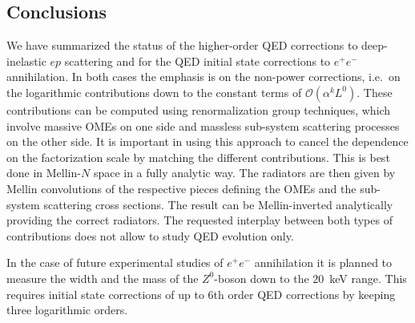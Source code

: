 \subsection{Conclusions}\label{sec:4}

\vspace*{1mm}
\noindent
We have summarized the status of the higher-order QED corrections to deep-inelastic $ep$ scattering and 
for the QED initial state corrections to $e^+e^-$ annihilation. In both cases the emphasis is on the non-power 
corrections, i.e.~on the logarithmic contributions down to the constant terms of $\mathcal{O}(\alpha^k L^0)$. These 
contributions can be computed using renormalization group techniques, which involve massive OMEs on one side 
and massless sub-system scattering processes on the other side. It is important in using this approach to cancel
the dependence on the factorization scale by matching the different contributions. This is best done in 
Mellin-$N$ space in a fully analytic way. The radiators are then given by Mellin convolutions of the respective 
pieces defining the OMEs and the sub-system scattering cross sections. The result can be Mellin-inverted
analytically providing the correct radiators. The requested interplay between both types of contributions does not
allow to study QED evolution only. 

In the case of future experimental studies of $e^+e^-$ annihilation it is planned to measure the width and the 
mass of the $Z^0$-boson down to the $20$~keV range. This requires initial state corrections of up to 6th order
QED corrections by keeping three logarithmic orders.

